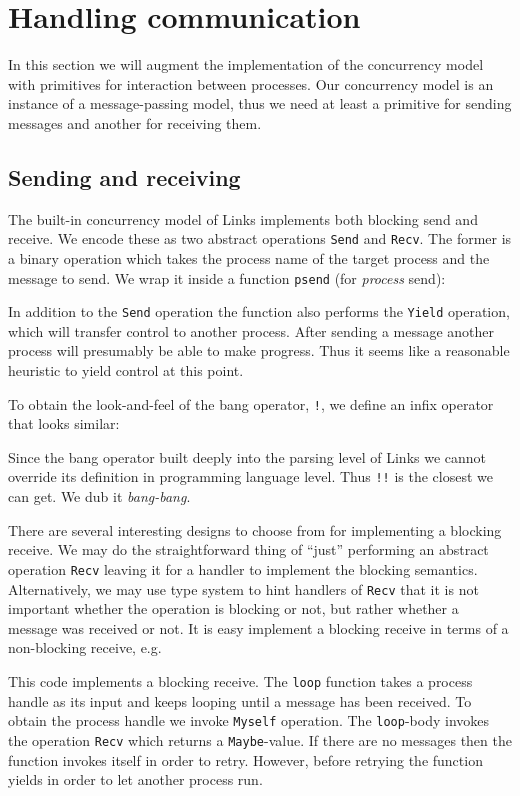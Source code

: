 \documentclass[12pt,mscres,cdtppar,twoside,openright,logo,rightchapter,normalheadings]{infthesis}
\newcommand{\snippet}[1]{}
\theoremstyle{definition}
\begin{document}
\section{Handling communication}
\label{sec:links-model-handlers-communication}

In this section we will augment the implementation of the concurrency
model with primitives for interaction between processes. Our
concurrency model is an instance of a message-passing model, thus we
need at least a primitive for sending messages and another for
receiving them.

\subsection{Sending and receiving}

The built-in concurrency model of Links implements both blocking send
and receive. We encode these as two abstract operations
\lstinline$Send$ and \lstinline$Recv$. The former is a binary
operation which takes the process name of the target process and the
message to send. We wrap it inside a function \lstinline$psend$ (for
\emph{process} send):
%
\snippet{psend.links}
%
In addition to the \lstinline$Send$ operation the function also
performs the \lstinline$Yield$ operation, which will transfer control
to another process. After sending a message another process will
presumably be able to make progress. Thus it seems like a reasonable
heuristic to yield control at this point.  

To obtain the look-and-feel of the bang operator, \lstinline$!$, we
define an infix operator that looks similar:
%
\snippet{psendOp.links}
%
Since the bang operator built deeply into the parsing level of Links
we cannot override its definition in programming language level. Thus
\lstinline$!!$ is the closest we can get. We dub it \emph{bang-bang}.

There are several interesting designs to choose from for implementing
a blocking receive. We may do the straightforward thing of ``just''
performing an abstract operation \lstinline$Recv$ leaving it for a
handler to implement the blocking semantics. Alternatively, we may use
type system to hint handlers of \lstinline$Recv$ that it is not
important whether the operation is blocking or not, but rather whether
a message was received or not. It is easy implement a blocking receive
in terms of a non-blocking receive, e.g.
%
\snippet{precv.links}
%
This code implements a blocking receive.  The \lstinline$loop$
function takes a process handle as its input and keeps looping until a
message has been received. To obtain the process handle we invoke
\lstinline$Myself$ operation. The \lstinline$loop$-body invokes the
operation \lstinline$Recv$ which returns a \lstinline$Maybe$-value. If
there are no messages then the function invokes itself in order to
retry. However, before retrying the function yields in order to let
another process run.
\end{document}
